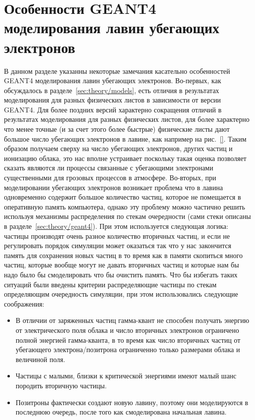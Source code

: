 \section{Особенности GEANT4 моделирования лавин убегающих электронов}\label{sec:thunderstorm/geant4}
В данном разделе указанны некоторые замечания касательно особенностей GEANT4 моделирования лавин убегающих электронов.
Во-первых, как обсуждалось в разделе~\ref{sec:theory/models}, есть отличия в результатах моделирования для разных физических листов в зависимости от версии GEANT4. Для более поздних версий характерно сокращения отличий в результатах моделирования для разных физических листов, для более характерно что менее точные (и за счет этого более быстрые) физические листы дают большое число убегающих электронов в лавине, как например на рис.~\ref{}. Таким образом получаем сверху на число убегающих электронов, других частиц и ионизацию облака, это нас вполне устраивает поскольку такая оценка позволяет сказать являются ли процессы связанные с убегающими электронами существенными для грозовых процессов в атмосфере.
Во-вторых, при моделировании убегающих электронов возникает проблема что в лавина одновременно содержит большое количество частиц, которое не помещается в оперативную память компьютера, однако эту проблему можно частично решить используя механизмы распределения по стекам очередности (сами стеки описаны в разделе~\ref{sec:theory/geant4}). При этом используется следующая логика: частицы производят очень разное количество вторичных частиц, и если не регулировать порядок симуляции может оказаться так что у нас закончится память для сохранения новых частиц в то время как в памяти скопиться много частиц, которые вообще могут не давать вторичных частиц и которые нам бы надо было бы смоделировать что бы очистить память. Что бы избегать таких ситуаций были введены критерии распределяющие частицы по стекам определяющим очередность симуляции, при этом использовались следующие соображения:
\begin{itemize}
   \item В отличии от заряженных частиц гамма-квант не способен получать энергию от электрического поля облака и число вторичных электронов ограничено полной энергией гамма-кванта, в то время как число вторичных частиц от убегающего электрона/позитрона ограниченно только размерами облака и величиной поля.
   \item Частицы с малыми, близки к критической энергиями имеют малый шанс породить вторичную частицы.
   \item Позитроны фактически создают новую лавину, поэтому они моделируются  в последнюю очередь, после того как смоделирована начальная лавина.
\end{itemize}

